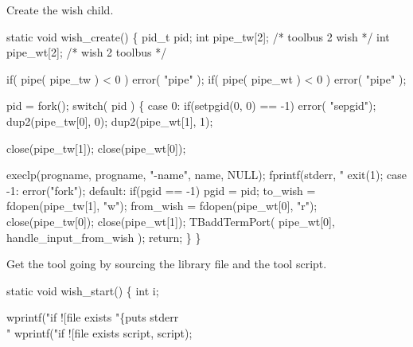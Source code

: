 

Create the wish child.

\nwenddocs{}\endmoddef\let\nwnotused=\nwoutput{}
static void wish_create()
\{
   pid_t pid;
   int   pipe_tw[2]; /* toolbus 2 wish */
   int   pipe_wt[2]; /* wish 2 toolbus */
   
   if( pipe( pipe_tw ) < 0 )
      error( "pipe" );
   if( pipe( pipe_wt ) < 0 )
      error( "pipe" );

   pid = fork();
   switch( pid )
   \{
      case 0:
         if(setpgid(0, 0) == -1)
            error( "sepgid");
         dup2(pipe_tw[0], 0);
         dup2(pipe_wt[1], 1);
         
         close(pipe_tw[1]);
         close(pipe_wt[0]);
         
         execlp(progname, progname, "-name", name, NULL);
         fprintf(stderr, "%
         exit(1);
      case -1:
         error("fork");
      default:
         if(pgid == -1)
            pgid = pid;
         to_wish = fdopen(pipe_tw[1], "w");
         from_wish = fdopen(pipe_wt[0], "r");
         close(pipe_tw[0]);
         close(pipe_wt[1]);
         TBaddTermPort( pipe_wt[0], handle_input_from_wish );
         return;
   \}
\}
\nwendcode{}\nwdocspar


Get the tool going by sourcing the library file and the tool script.

\nwenddocs{}\endmoddef\let\nwnotused=\nwoutput{}
static void wish_start()
\{
   int i;

   wprintf("if ![file exists %
                      "\{puts stderr \\"%
   wprintf("if ![file exists %
                                                        script, script);
   
